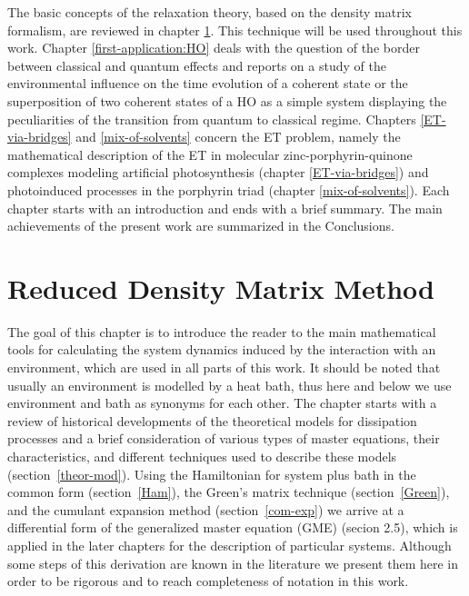 \documentclass[12pt,twoside,a4paper]{report}
\begin{document}
The basic concepts of the relaxation theory, based on the density matrix 
formalism,  
are
reviewed in chapter \ref{method-RDM}. 
This technique will be used 
throughout this work. Chapter \ref{first-application:HO} 
deals with the question of  the 
border between classical and quantum effects and reports on 
a  study of the 
environmental influence on the time evolution of a coherent state or 
the superposition of two coherent states of 
a HO as  
a simple system
displaying the peculiarities of 
the transition from quantum to classical regime.
Chapters \ref{ET-via-bridges} and \ref{mix-of-solvents} 
concern the ET problem, namely the mathematical description of the ET in 
molecular
zinc-porphyrin-quinone  complexes modeling artificial 
photosynthesis (chapter \ref{ET-via-bridges}) 
and  photoinduced processes in the porphyrin 
triad (chapter \ref{mix-of-solvents}). 
Each chapter starts with an introduction and ends 
with a brief summary. The main achievements of the present work are 
summarized in the Conclusions. 
 
\chapter{
            Reduced Density Matrix Method}      
\label{method-RDM}
%
The goal of this chapter is to introduce the reader to 
the main mathematical tools 
for calculating the  system dynamics induced by the interaction
with an environment, which are used in all parts of this
work. It should be noted that usually an environment is modelled by
a heat bath, thus here and below 
we use environment and bath as synonyms for each other.
The chapter starts with a review of historical
developments of the theoretical models for dissipation processes and a
brief consideration of various types of master equations, their
characteristics, and different techniques used to describe these
models (section~\ref{theor-mod}). 
Using  the Hamiltonian for system plus bath in 
the common form  (section~\ref{Ham}),
the Green's matrix technique (section~\ref{Green}), and 
the cumulant expansion method (section~\ref{com-exp}) 
we arrive at
a differential form of the generalized master equation (GME) (secion 2.5), which is applied
in the later chapters for the description of 
particular systems. 
Although some steps of
this derivation are known in the literature we present 
them here
in order  
to be rigorous and to reach  completeness of notation in this work.
\end{document}
